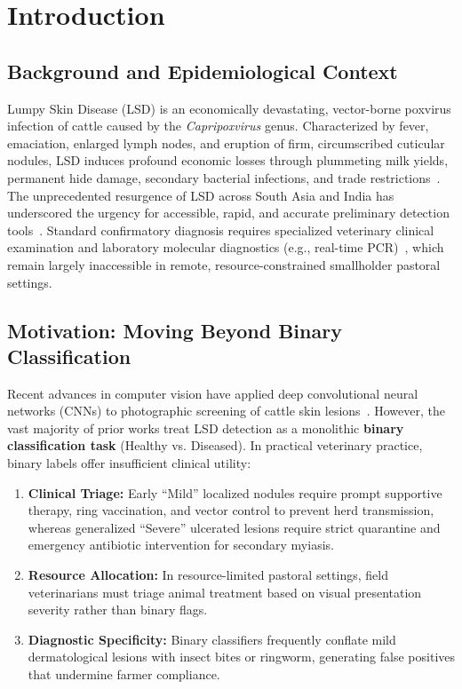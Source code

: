 \documentclass[conference]{IEEEtran}
\begin{document}
\section{Introduction}

\subsection{Background and Epidemiological Context}
Lumpy Skin Disease (LSD) is an economically devastating, vector-borne poxvirus infection of cattle caused by the \textit{Capripoxvirus} genus. Characterized by fever, emaciation, enlarged lymph nodes, and eruption of firm, circumscribed cuticular nodules, LSD induces profound economic losses through plummeting milk yields, permanent hide damage, secondary bacterial infections, and trade restrictions~\cite{gupta2020review, manjunathareddy2024pathological}. The unprecedented resurgence of LSD across South Asia and India has underscored the urgency for accessible, rapid, and accurate preliminary detection tools~\cite{gupta2020review}. Standard confirmatory diagnosis requires specialized veterinary clinical examination and laboratory molecular diagnostics (e.g., real-time PCR)~\cite{manjunathareddy2024pathological}, which remain largely inaccessible in remote, resource-constrained smallholder pastoral settings.

\subsection{Motivation: Moving Beyond Binary Classification}
Recent advances in computer vision have applied deep convolutional neural networks (CNNs) to photographic screening of cattle skin lesions~\cite{senthilkumar2024early, pal2025implementation, ullah2026vision}. However, the vast majority of prior works treat LSD detection as a monolithic \textbf{binary classification task} (Healthy vs. Diseased). In practical veterinary practice, binary labels offer insufficient clinical utility:
\begin{enumerate}
    \item \textbf{Clinical Triage:} Early ``Mild'' localized nodules require prompt supportive therapy, ring vaccination, and vector control to prevent herd transmission, whereas generalized ``Severe'' ulcerated lesions require strict quarantine and emergency antibiotic intervention for secondary myiasis.
    \item \textbf{Resource Allocation:} In resource-limited pastoral settings, field veterinarians must triage animal treatment based on visual presentation severity rather than binary flags.
    \item \textbf{Diagnostic Specificity:} Binary classifiers frequently conflate mild dermatological lesions with insect bites or ringworm, generating false positives that undermine farmer compliance.
\end{enumerate}
\end{document}
